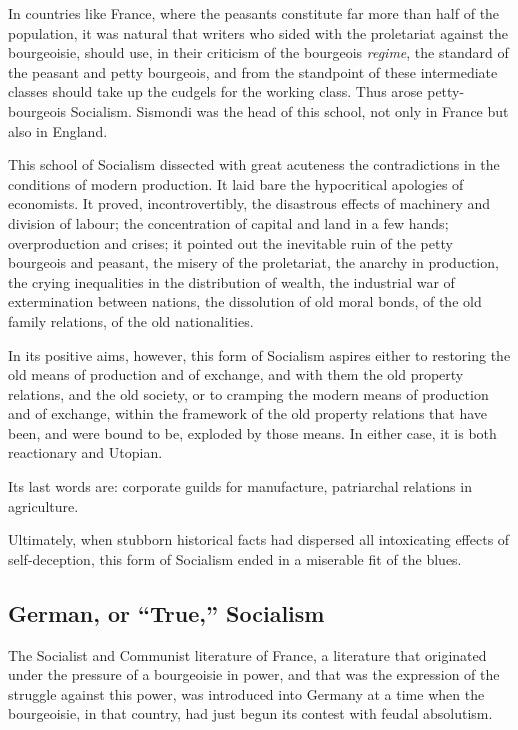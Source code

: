 In countries like France, where the peasants constitute far more than
half of the population, it was natural that writers who sided with the
proletariat against the bourgeoisie, should use, in their criticism of
the bourgeois \textit{regime}, the standard of the peasant and petty
bourgeois, and from the standpoint of these intermediate classes should
take up the cudgels for the working class. Thus arose petty-bourgeois
Socialism. Sismondi was the head of this school, not only in France but
also in England.

This school of Socialism dissected with great acuteness the
contradictions in the conditions of modern production. It laid bare the
hypocritical apologies of economists. It proved, incontrovertibly, the
disastrous effects of machinery and division of labour; the
concentration of capital and land in a few hands; overproduction and
crises; it pointed out the inevitable ruin of the petty bourgeois and
peasant, the misery of the proletariat, the anarchy in production, the
crying inequalities in the distribution of wealth, the industrial war
of extermination between nations, the dissolution of old moral bonds,
of the old family relations, of the old nationalities.

In its positive aims, however, this form of Socialism aspires either to
restoring the old means of production and of exchange, and with them
the old property relations, and the old society, or to cramping the
modern means of production and of exchange, within the framework of the
old property relations that have been, and were bound to be, exploded
by those means. In either case, it is both reactionary and Utopian.

Its last words are: corporate guilds for manufacture, patriarchal
relations in agriculture.

Ultimately, when stubborn historical facts had dispersed all
intoxicating effects of self-deception, this form of Socialism ended in
a miserable fit of the blues.

\subsection*{German, or ``True,'' Socialism}


The Socialist and Communist literature of France, a literature that
originated under the pressure of a bourgeoisie in power, and that was
the expression of the struggle against this power, was introduced into
Germany at a time when the bourgeoisie, in that country, had just begun
its contest with feudal absolutism.


